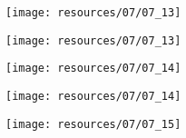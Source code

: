 \begin{frame}{ }
    \centering
    \texttt{[image: resources/07/07\_13]}
\end{frame}
\begin{frame}{ }
    \centering
    \texttt{[image: resources/07/07\_13]}
\end{frame}
\begin{frame}{ }
    \centering
    \texttt{[image: resources/07/07\_14]}
\end{frame}
\begin{frame}{ }
    \centering
    \texttt{[image: resources/07/07\_14]}
\end{frame}
\begin{frame}{ }
    \centering
    \texttt{[image: resources/07/07\_15]}
\end{frame}
